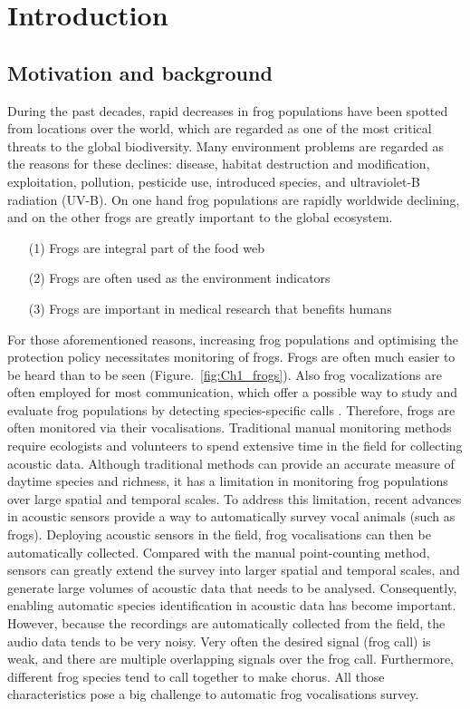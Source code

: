 
\chapter[Introduction]{Introduction}
\label{cha:cha1Introduction}

\section{Motivation and background}
During the past decades, rapid decreases in frog populations have been spotted from locations over the world, which are regarded as one of the most critical threats to the global biodiversity. Many environment problems are regarded as the reasons for these declines: disease, habitat destruction and modification, exploitation, pollution, pesticide use, introduced species, and ultraviolet-B radiation (UV-B). 
On one hand frog populations are rapidly worldwide declining, and on the other frogs are greatly important to the global ecosystem. 
\begin{enumerate}
\item[(1)] Frogs are integral part of the food web
\item[(2)] Frogs are often used as the environment indicators 
\item[(3)] Frogs are important in medical research that benefits humans 
\end{enumerate}

For those aforementioned reasons, increasing frog populations and optimising the protection policy necessitates monitoring of frogs. Frogs are often much easier to be heard than to be seen (Figure.~\ref{fig:Ch1_frogs}). Also frog vocalizations are often employed for most communication, which offer a possible way to study and evaluate frog populations by detecting species-specific calls \citep{dorcas2009auditory}. Therefore, frogs are often monitored via their vocalisations. Traditional manual monitoring methods require ecologists and volunteers to spend extensive time in the field for collecting acoustic data. Although traditional methods can provide an accurate measure of daytime species and richness, it has a limitation in monitoring frog populations over large spatial and temporal scales.
To address this limitation, recent advances in acoustic sensors provide a way to automatically survey vocal animals (such as frogs). Deploying acoustic sensors in the field, frog vocalisations can then be automatically collected. Compared with the manual point-counting method, sensors can greatly extend the survey into larger spatial and temporal scales, and generate large volumes of acoustic data that needs to be analysed. Consequently, enabling automatic species identification in acoustic data has become important. However, because the recordings are automatically collected from the field, the audio data tends to be very noisy. Very often the desired signal (frog call) is weak, and there are multiple overlapping signals over the frog call. Furthermore, different frog species tend to call together to make chorus. All those characteristics pose a big challenge to automatic frog vocalisations survey.

